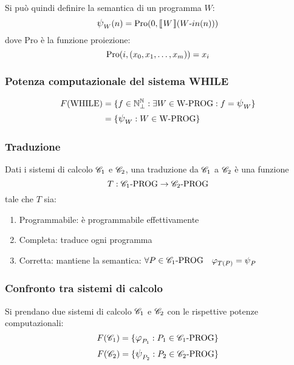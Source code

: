 Si può quindi definire la semantica di un programma $W$:
$$\semanticaWHILE_W(n) = \Pro(0,\opsemWHILE{W}{\text{$W$-$in$}(n)})$$
dove Pro è la funzione proiezione:
$$ \text{Pro}(i,(x_0,x_1,\dots,x_m)) = x_i $$

\subsubsection*{Potenza computazionale del sistema WHILE}
$$ \begin{aligned}
    F(\text{WHILE}) &= \{ f\in\N^\N_\perp : \exists W\in \text{W-PROG}:f=\semanticaWHILE_W \}\\
    &= \{ \semanticaWHILE_W : W \in \text{W-PROG} \} 
    \end{aligned}
$$

\subsubsection{Traduzione}
Dati i sistemi di calcolo $\mathscr{C}_1$ e $\mathscr{C}_2$, una traduzione da $\mathscr{C}_1$ a $\mathscr{C}_2$ è una funzione
$$ T:\mathscr{C}_1\text{-PROG}\to\mathscr{C}_2\text{-PROG} $$
tale che $T$ sia:
\begin{enumerate}
    \item Programmabile: è programmabile effettivamente
    \item Completa: traduce ogni programma
    \item Corretta: mantiene la semantica:
        $\forall P\in\SC_1\text{-PROG} \quad \semanticaRAM_{T(P)}=\semanticaWHILE_{P}$
\end{enumerate}
\subsubsection{Confronto tra sistemi di calcolo}
Si prendano due sistemi di calcolo $\mathscr{C}_1$ e $\mathscr{C}_2$ con le rispettive potenze computazionali:
$$ F(\SC_1) = \{\semanticaRAM_{P_1}:P_1\in\SC_1\text{-PROG}\} $$
$$ F(\SC_2) = \{\semanticaWHILE_{P_2}:P_2\in\SC_2\text{-PROG}\} $$

